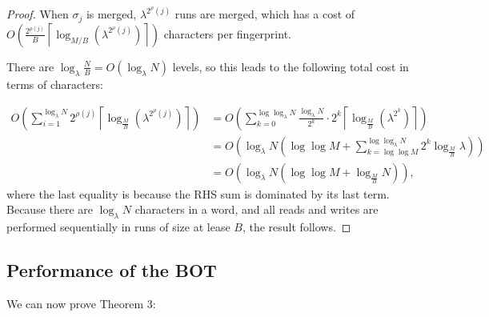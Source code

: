 \begin{proof}
	When $\sigma_j$ is merged, $\lambda^{2^\rho(j)}$ runs are merged, which has
	a cost of
	$O\left(\frac{2^{\rho(j)}}{B}\left\lceil\log_{M/B}\left(\lambda^{2^\rho(j)}\right)\right\rceil\right)$
	characters per fingerprint.

	There are $\log_\lambda \frac{N}{B} = O(\log_\lambda N)$ levels, so this leads to the
	following total cost in terms of characters:

	\begin{align*}
		O\left(\sum_{i=1}^{\log_\lambda N} 2^{\rho(j)}\left\lceil\log_{\frac{M}{B}}\left(\lambda^{2^\rho(j)}\right)\right\rceil\right)
		&= O\left(\sum_{k=0}^{\log \log_\lambda N} \frac{\log_\lambda N}{2^k} \cdot 2^k \left\lceil\log_{\frac{M}{B}}\left(\lambda^{2^k}\right)\right\rceil\right) \\
		&= O\left(\log_\lambda N \left(\log\log M + \sum_{k=\log\log M}^{\log \log_\lambda N} 2^k\log_{\frac{M}{B}}\lambda\right)\right) \\
		&= O\left(\log_\lambda N\left(\log\log M + \log_{\frac{M}{B}}N\right)\right),
	\end{align*}
	where the last equality is because the RHS sum is dominated by its last
	term. Because there are $\log_\lambda N$ characters in a word, and all
	reads and writes are performed sequentially in runs of size at lease $B$,
	the result follows.
\end{proof}

\subsection{Performance of the BOT}

We can now prove Theorem 3:

\botcost*


